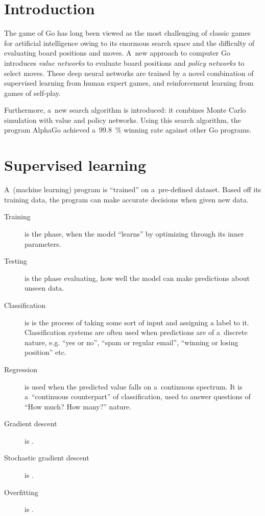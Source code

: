 \documentclass[a4paper,10pt]{article}
\begin{document}

\section{Introduction}
The game of Go has long been viewed as the most challenging of classic games for artificial intelligence owing to its enormous search space and the difficulty of evaluating board positions and moves.
A~new approach to computer Go introduces \emph{value networks} to evaluate board positions and \emph{policy networks} to select moves.
These deep neural networks are trained by a novel combination of supervised learning from human expert games, and reinforcement learning from games of self-play.

Furthermore, a~new search algorithm is introduced: it combines Monte Carlo simulation with value and policy networks.
Using this search algorithm, the program AlphaGo achieved a~99.8~\% winning rate against other Go programs.

\section{Supervised learning}
A~(machine learning) program is ``trained'' on a~pre-defined dataset.
Based off its training data, the program can make accurate decisions when given new data.
\begin{description}
  \item [Training] is the phase, when the model ``learns'' by optimizing through its inner parameters.
  \item [Testing] is the phase evaluating, how well the model can make predictions about unseen data.
  \item [Classification] is is the process of taking some sort of input and assigning a label to it.
    Classification systems are often used when predictions are of a~discrete nature, e.g. ``yes or no'', ``spam or regular email'', ``winning or losing position'' etc.
  \item [Regression] is used when the predicted value falls on a~continuous spectrum.
    It is a~``continuous counterpart'' of classification, used to answer questions of ``How much? How many?'' nature.
  \item [Gradient descent] is \todo.
  \item [Stochastic gradient descent] is \todo.
  \item [Overfitting] is \todo.
\end{description}
\end{document}
